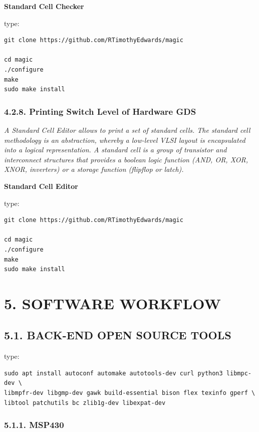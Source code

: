\documentclass[]{article}
\begin{document}
\textbf{Standard Cell Checker}

type:

\begin{verbatim}
git clone https://github.com/RTimothyEdwards/magic

cd magic
./configure
make
sudo make install
\end{verbatim}

\subsubsection{4.2.8. Printing Switch Level of Hardware
GDS}\label{printing-switch-level-of-hardware-gds}

\emph{A Standard Cell Editor allows to print a set of standard cells.
The standard cell methodology is an abstraction, whereby a low-level
VLSI layout is encapsulated into a logical representation. A standard
cell is a group of transistor and interconnect structures that provides
a boolean logic function (AND, OR, XOR, XNOR, inverters) or a storage
function (flipflop or latch).}

\textbf{Standard Cell Editor}

type:

\begin{verbatim}
git clone https://github.com/RTimothyEdwards/magic

cd magic
./configure
make
sudo make install
\end{verbatim}

\section{5. SOFTWARE WORKFLOW}\label{software-workflow}

\subsection{5.1. BACK-END OPEN SOURCE
TOOLS}\label{back-end-open-source-tools-1}

type:

\begin{verbatim}
sudo apt install autoconf automake autotools-dev curl python3 libmpc-dev \
libmpfr-dev libgmp-dev gawk build-essential bison flex texinfo gperf \
libtool patchutils bc zlib1g-dev libexpat-dev
\end{verbatim}

\subsubsection{5.1.1. MSP430}\label{msp430}
\end{document}
